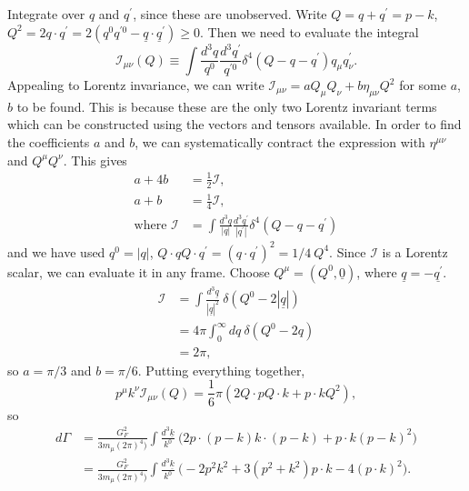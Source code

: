\documentclass[a4paper,12pt]{article}
\begin{document}
Integrate over $q$ and $q^\prime$, since these are unobserved. Write $Q = q + q^\prime = p - k$, $Q^2 = 2 q \cdot q^\prime = 2(q^0 q^{\prime 0} -\underline{q}\cdot \underline{q}^\prime) \geq 0$. Then we need to evaluate the integral
\begin{equation}
	\mathcal{I}_{\mu \nu}(Q) \equiv \int \frac{d^3q}{q^0} \frac{d^3 q^\prime}{q^{\prime 0}} \delta^4(Q - q - q^\prime) q_\mu q^\prime_\nu.
\end{equation}
Appealing to Lorentz invariance, we can write $\mathcal{I}_{\mu \nu} = a Q_\mu Q_\nu + b \eta_{\mu \nu} Q^2$ for some $a$, $b$ to be found. This is because these are the only two Lorentz invariant terms which can be constructed using the vectors and tensors available. In order to find the coefficients $a$ and $b$, we can systematically contract the expression with $\eta^{\mu \nu}$ and $Q^\mu Q^\nu$. This gives
\begin{equation}
\begin{split}
a + 4b &= \frac{1}{2}\mathcal{I}, \\
a + b &= \frac{1}{4}\mathcal{I}, \\
\text{where } \mathcal{I} &= \int \frac{d^3q}{|q|} \frac{d^3 q^\prime}{|q^\prime|} \delta^4(Q - q - q^\prime)
\end{split}
\end{equation}
and we have used $q^0 = |q|$, $Q \cdot q Q \cdot q^\prime = (q \cdot q^\prime)^2 = 1/4\ Q^4$. Since $\mathcal{I}$ is a Lorentz scalar, we can evaluate it in any frame. Choose $Q^\mu = (Q^0, \underline{0})$, where $\underline{q} = - \underline{q^\prime}$.
\begin{equation}
\begin{split}
\mathcal{I} &= \int \frac{d^3\underline{q}}{|\underline{q}|^2}\ \delta(Q^0 - 2 |\underline{q}|) \\
&= 4 \pi \int_0^\infty dq\ \delta(Q^0 - 2q) \\
&= 2 \pi,
\end{split}
\end{equation}
so $a = \pi /3$ and $b= \pi /6$. Putting everything together,
\begin{equation}
p^\mu k^\nu \mathcal{I}_{\mu \nu}(Q) = \frac{1}{6} \pi (2 Q \cdot p Q \cdot k + p \cdot k Q^2),
\end{equation}
so 
\begin{equation}
\begin{split}
    d\Gamma &= \frac{G_F^2}{3 m_\mu (2\pi)^4)} \int \frac{d^3\underline{k}}{k^0}\ \bigg(2p \cdot (p-k) k \cdot (p-k) + p \cdot k (p-k)^2\bigg) \\
    &= \frac{G_F^2}{3 m_\mu (2\pi)^4)}  \int \frac{d^3\underline{k}}{k^0}\ \bigg(-2p^2k^2 + 3(p^2+k^2)p \cdot k -4(p \cdot k)^2\bigg).
\end{split}
\end{equation}
\end{document}
